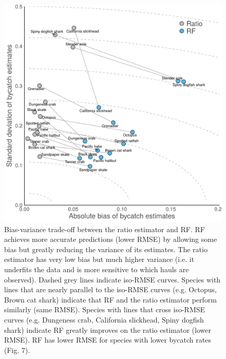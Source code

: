 \documentclass[]{article}
\begin{document}
\begin{figure}

{\centering \includegraphics[width=6in]{../figures/supplement/fig7_tradeoffs_v2} 

}

\caption{Bias-variance trade-off between the ratio estimator and RF. RF achieves more accurate predictions (lower RMSE) by allowing some bias but greatly reducing the variance of its estimates. The ratio estimator has very low bias but much higher variance (i.e. it underfits the data and is more sensitive to which hauls are observed). Dashed grey lines indicate iso-RMSE curves. Species with lines that are nearly parallel to the iso-RMSE curves (e.g. Octopus, Brown cat shark) indicate that RF and the ratio estimator perform similarly (same RMSE). Species with lines that cross iso-RMSE curves (e.g. Dungeness crab, California slickhead, Spiny dogfish shark) indicate RF greatly improves on the ratio estimator (lower RMSE). RF has lower RMSE for species with lower bycatch rates (Fig. 7).}\label{fig:variance-bias}
\end{figure}
\end{document}

